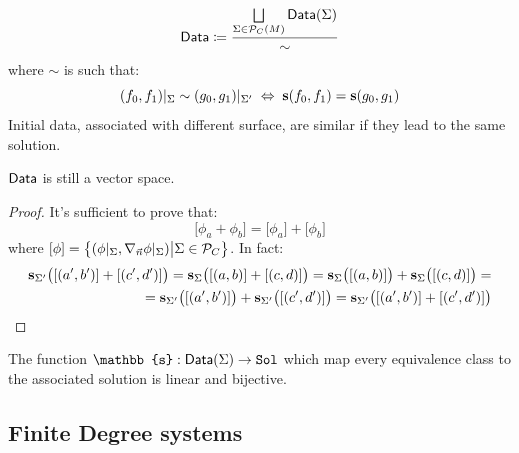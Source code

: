 \documentclass[Main]{subfiles}
\begin{document}
			\begin{definition}
				\begin{displaymath}
					\mathsf{Data}  \coloneqq \frac{\bigsqcup\limits_{\Sigma \in \mathcal{P}_C(M)}\mathsf{Data}(\Sigma)}{\sim} 
				\end{displaymath}
				where $\sim$ is such that:
				\begin{displaymath}
					(f_0, f_1)|_\Sigma \sim (g_0, g_1)|_{\Sigma'} \; \Leftrightarrow \; \mathbf{s}(f_0,f_1) =  \mathbf{s}(g_0,g_1) 
				\end{displaymath}
				\footnotesize{ Initial data, associated with different surface, are similar if they lead to the same solution.}	
			\end{definition}
			
			\begin{proposition}
				$\mathsf{Data}$ is still a vector space.
			\end{proposition}
			\begin{proof}\danger
				It's sufficient to prove that:
				\begin{displaymath}
					\big[ \phi_a + \phi_b \big] = \big[ \phi_a \big] + \big[ \phi_b \big]
				\end{displaymath}
				where $[\phi]= \big\{(\phi\vert_\Sigma , \nabla_{\vec{n}}\phi \vert_\Sigma) \big\vert \Sigma \in \mathcal{P}_C \big\}$.
				In fact:
				\begin{align*}
					 \mathbf{s}_{\Sigma'}\big([(a',b')] + [(c',d')] \big)=\mathbf{s}_\Sigma\big([(a,b)] + [(c,d)] \big) = \mathbf{s}_\Sigma\big([(a,b)] \big)+ \mathbf{s}_\Sigma\big([(c,d)] \big) =\\
					 =\mathbf{s}_{\Sigma'}\big([(a',b')] \big)+ \mathbf{s}_{\Sigma'}\big([(c',d')] \big) = \mathbf{s}_{\Sigma'}\big([(a',b')] +[(c',d')] \big)
				\end{align*}

			\end{proof}
			\begin{corollary}
				The function  $ 	 \mathbb{s} : \Data (\Sigma ) \rightarrow \Sol $ which map every equivalence class to the associated solution is linear and bijective.
			\end{corollary}


		\subsection{Finite Degree systems}
		
\end{document}
